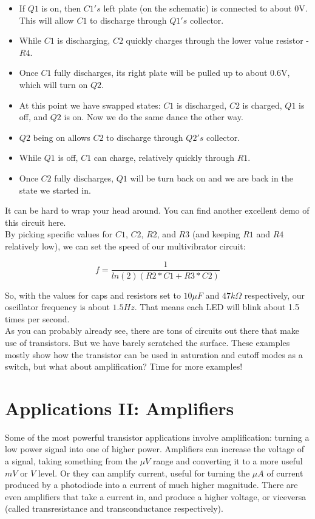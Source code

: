 \documentclass[a4paper, 11pt]{article} %
\begin{document}
\begin{itemize}
\item If $Q1$ is on, then $C1's$ left plate (on the schematic) is connected to about 0V. This will allow $C1$ to discharge through $Q1's$ collector.
\item While $C1$ is discharging, $C2$ quickly charges through the lower value resistor - $R4$.
\item Once $C1$ fully discharges, its right plate will be pulled up to about 0.6V, which will turn on $Q2$.
\item At this point we have swapped states: $C1$ is discharged, $C2$ is charged, $Q1$ is off, and $Q2$ is on. Now we do the same dance the other way.
\item $Q2$ being on allows $C2$ to discharge through $Q2's$ collector.
\item While $Q1$ is off, $C1$ can charge, relatively quickly through $R1$.
\item Once $C2$ fully discharges, $Q1$ will be turn back on and we are back in the state we started in.
\end{itemize}

It can be hard to wrap your head around. You can find another excellent demo of this circuit here.\\

By picking specific values for $C1$, $C2$, $R2$, and $R3$ (and keeping $R1$ and $R4$ relatively low), we can set the speed of our multivibrator circuit:

$$f = \frac{1}{ln(2) (R2*C1 + R3*C2)}$$

So, with the values for caps and resistors set to $10\mu F$ and $47k\Omega$ respectively, our oscillator frequency is about $1.5 Hz$. That means each LED will blink about 1.5 times per second.\\

As you can probably already see, there are tons of circuits out there that make use of transistors. But we have barely scratched the surface. These examples mostly show how the transistor can be used in saturation and cutoff modes as a switch, but what about amplification? Time for more examples!


\section*{Applications II: Amplifiers}

Some of the most powerful transistor applications involve amplification: turning a low power signal into one of higher power. Amplifiers can increase the voltage of a signal, taking something from the $\mu V$ range and converting it to a more useful $mV$ or $V$ level. Or they can amplify current, useful for turning the $\mu A$ of current produced by a photodiode into a current of much higher magnitude. There are even amplifiers that take a current in, and produce a higher voltage, or viceversa (called transresistance and transconductance respectively).\\
\end{document}
